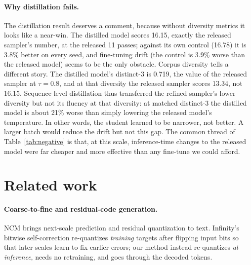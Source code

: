 \documentclass[10pt]{article}
\begin{document}
\paragraph{Why distillation fails.} The distillation result deserves a comment, because without diversity metrics it looks like a near-win. The distilled model scores 16.15, exactly the released sampler's number, at the released 11 passes; against its own control (16.78) it is 3.8\% better on every seed, and fine-tuning drift (the control is 3.9\% worse than the released model) seems to be the only obstacle. Corpus diversity tells a different story. The distilled model's distinct-3 is 0.719, the value of the released sampler at $\tau{=}0.8$, and at that diversity the released sampler scores 13.34, not 16.15. Sequence-level distillation \citep{kim2016seqkd} thus transferred the refined sampler's lower diversity but not its fluency at that diversity: at matched distinct-3 the distilled model is about 21\% worse than simply lowering the released model's temperature. In other words, the student learned to be narrower, not better. A larger batch would reduce the drift but not this gap. The common thread of Table~\ref{tab:negative} is that, at this scale, inference-time changes to the released model were far cheaper and more effective than any fine-tune we could afford.

\section{Related work}
\label{sec:related}

\paragraph{Coarse-to-fine and residual-code generation.} NCM \citep{kumbong2026ncm} brings next-scale prediction \citep{tian2024var,kumbong2025hmar} and residual quantization \citep{lee2022rqvae,borsos2023soundstorm} to text. Infinity's bitwise self-correction \citep{han2024infinity} re-quantizes \emph{training} targets after flipping input bits so that later scales learn to fix earlier errors; our method instead re-quantizes \emph{at inference}, needs no retraining, and goes through the decoded tokens.
\end{document}
